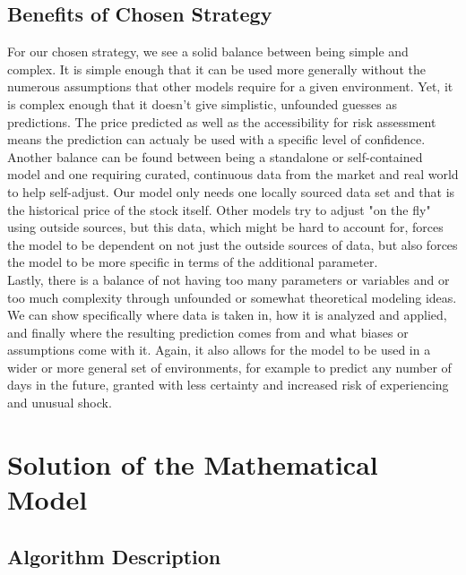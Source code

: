 \documentclass{article}
\begin{document}
\subsection{Benefits of Chosen Strategy}
For our chosen strategy, we see a solid balance between being simple and complex. It is simple enough that it can be used more generally without the numerous assumptions that other models require for a given environment. Yet, it is complex enough that it doesn't give simplistic, unfounded guesses as predictions. The price predicted as well as the accessibility for risk assessment means the prediction can actualy be used with a specific level of confidence.\\
Another balance can be found between being a standalone or self-contained model and one requiring curated, continuous data from the market and real world to help self-adjust. Our model only needs one locally sourced data set and that is the historical price of the stock itself. Other models try to adjust "on the fly" using outside sources, but this data, which might be hard to account for, forces the model to be dependent on not just the outside sources of data, but also forces the model to be more specific in terms of the additional parameter.\\
Lastly, there is a balance of not having too many parameters or variables and or too much complexity through unfounded or somewhat theoretical modeling ideas. We can show specifically where data is taken in, how it is analyzed and applied, and finally where the resulting prediction comes from and what biases or assumptions come with it. Again, it also allows for the model to be used in a wider or more general set of environments, for example to predict any number of days in the future, granted with less certainty and increased risk of experiencing and unusual shock.

\section{Solution of the Mathematical Model}

\subsection{Algorithm Description}
\end{document}
